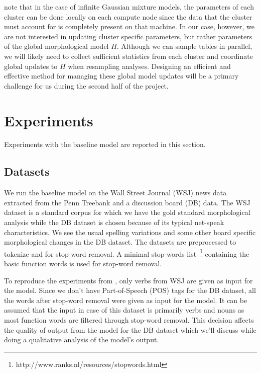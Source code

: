 \documentclass{article}
\begin{document}
\cite{lovell2012} note that in the case of infinite Gaussian mixture
models, the parameters of each cluster can be done locally on each
compute node since the data that the cluster must account for is
completely present on that machine. In our case, however, we are not
interested in updating cluster specific parameters, but rather
parameters of the global morphological model $H$. Although we can
sample tables in parallel, we will likely need to collect sufficient
statistics from each cluster and coordinate global updates to $H$ when
resampling analyses. Designing an efficient and effective method for
managing these global model updates will be a primary challenge for us
during the second half of the project.

\section{Experiments}
\label{sec:experiments}

Experiments with the baseline model are reported in this section.

\subsection{Datasets}

We run the baseline model on the Wall Street Journal (WSJ) news data extracted from the Penn Treebank
and a discussion board (DB) data. The WSJ dataset is a standard corpus 
for which we have the gold standard morphological analysis while the DB dataset 
is chosen because of its typical net-speak characteristics. We see 
the usual spelling variations and some other board specific morphological
 changes in the DB dataset. The datasets are preprocessed to tokenize 
and for stop-word removal. A minimal stop-words 
list~\footnote{http://www.ranks.nl/resources/stopwords.html} containing 
the basic function words is used for stop-word removal.

To reproduce the experiments from \cite{goldwater2011}, only verbs from WSJ 
are given as input for the model. Since we don't have Part-of-Speech (POS)
 tags for the DB dataset, all the words after stop-word removal were 
given as input for the model. It can be assumed that the input in case of 
this dataset is primarily verbs and nouns as most function words are filtered 
through stop-word removal. This decision affects the quality of output 
from the model for the DB dataset which we'll discuss while doing a 
qualitative analysis of the model's output.
\end{document}
